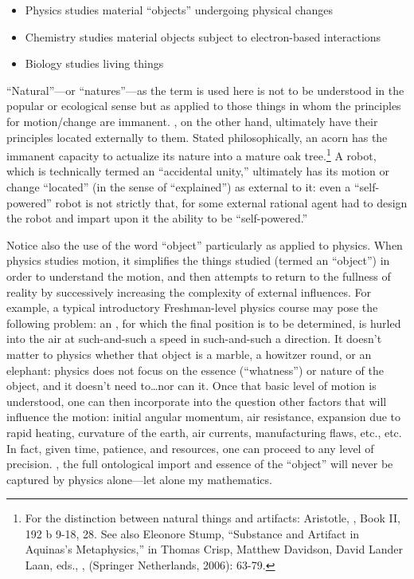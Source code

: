 \begin{itemize}
\item Physics studies  material ``objects'' undergoing physical changes
\item Chemistry studies  material objects subject to electron-based interactions
\item Biology studies  living things
\end{itemize}

``Natural''---or ``natures''---as the term is used here is not to be understood in the popular or ecological sense but as applied to those things in whom the principles for motion/change are immanent. , on the other hand, ultimately have their principles located externally to them. Stated philosophically, an acorn has the immanent capacity to actualize its nature into a mature oak tree.\footnote{For the distinction between natural things and artifacts: Aristotle, , Book II, 192 b 9-18, 28. See also Eleonore Stump, ``Substance and Artifact in Aquinas's Metaphysics,'' in Thomas Crisp, Matthew Davidson, David Lander Laan, eds., , (Springer Netherlands, 2006): 63-79.} A robot, which is technically termed an ``accidental unity,'' ultimately has its motion or change ``located'' (in the sense of ``explained'') as external to it: even a ``self-powered'' robot is not strictly that, for some external rational agent had to design the robot and impart upon it the ability to be ``self-powered.''

Notice also the use of the word ``object'' particularly as applied to physics. When physics studies motion, it simplifies the things studied (termed an ``object'') in order to understand the motion, and then attempts to return to the fullness of reality by successively increasing the complexity of external influences. For example, a typical introductory Freshman-level physics course may pose the following problem: an , for which the final position is to be determined, is hurled into the air at such-and-such a speed in such-and-such a direction. It doesn't matter to physics whether that object is a marble, a howitzer round, or an elephant: physics does not focus on the essence (``whatness'') or nature of the object, and it doesn't need to\ldots nor can it. Once that basic level of motion is understood, one can then incorporate into the question other factors that will influence the motion: initial angular momentum, air resistance, expansion due to rapid heating, curvature of the earth, air currents, manufacturing flaws, etc., etc. In fact, given time, patience, and resources, one can proceed to any level of precision. , the full ontological import and essence of the ``object'' will never be captured by physics alone---let alone my mathematics.

